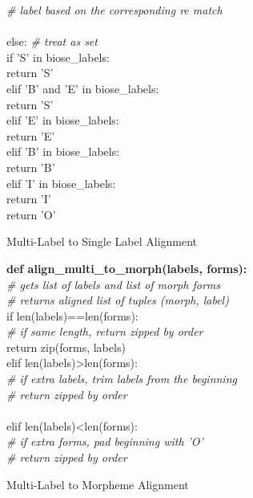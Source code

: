 \documentclass[11pt,a4paper]{article}
\begin{document}
\begin{figure}[t]
\indent \indent \emph{\# label based on the corresponding re match } \\
\indent \indent [...] \\ 
\indent else: \emph{\# treat as set}\\
\indent \indent if 'S' in biose\_labels:\\
\indent \indent\indent return 'S'\\
\indent \indent    elif 'B' and 'E' in biose\_labels:\\
\indent \indent\indent        return 'S'\\
\indent \indent    elif 'E' in biose\_labels:\\
\indent \indent\indent        return 'E'\\
\indent \indent    elif 'B' in biose\_labels:\\
\indent \indent\indent        return 'B'\\
\indent \indent    elif 'I' in biose\_labels:\\
\indent \indent\indent        return 'I'\\
\indent \indent    return 'O'\\
\caption{Multi-Label to Single Label Alignment }\label{appendix:align-to-labels}
\end{figure}

\begin{figure}[t]
\textbf{def align\_multi\_to\_morph(labels, forms):}\\
\emph{\# gets list of labels and list of morph forms}\\
\emph{\# returns aligned list of tuples (morph, label)}\\
\indent if len(labels)==len(forms):\\ 
\indent \emph{\# if same length, return zipped by order}\\
\indent \indent return zip(forms, labels)\\
\indent elif len(labels)>len(forms):\\
\indent \emph{\# if extra labels, trim labels from the beginning}\\
\indent \emph{\# return zipped by order}\\
\indent \indent [ ... ]\\
\indent elif len(labels)<len(forms):\\
\indent \emph{\# if extra forms, pad beginning with 'O'}\\
\indent \emph{\# return zipped by order}\\
\indent \indent [ ... ]


    \caption{Multi-Label to Morpheme Alignment}
    \label{appendix:align-to-morphs}
\end{figure}
\end{document}
